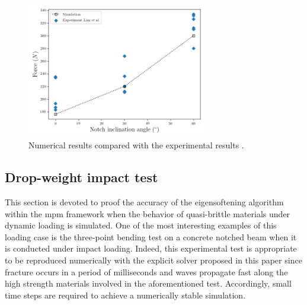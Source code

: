 \documentclass[preprint,12pt,a4paper]{elsarticle}
\begin{document}
\begin{figure}
  \centering
  \includegraphics[width=0.7\textwidth]{./Figure-Angle-Forces-test}
  \caption{Numerical results compared with the experimental results \cite{LIM_1993}.}
  \label{fig:plot-Angle-Forces-test}
\end{figure}



\subsection{Drop-weight impact test}
\label{sec:3.3}
This section is devoted to proof
the accuracy of the eigensoftening algorithm within the \acrshort{mpm} framework when the behavior
of quasi-brittle materials under dynamic loading is simulated. One of the most interesting examples of this
loading case is the three-point bending test on a concrete notched beam when it is conducted under impact loading. Indeed, this experimental test is appropriate to be reproduced numerically with the explicit solver proposed in this paper since
fracture occurs in a period of milliseconds and waves propagate fast along the high strength
materials involved in the aforementioned test. Accordingly, small time steps are
required to achieve a numerically stable simulation.\\
\end{document}

